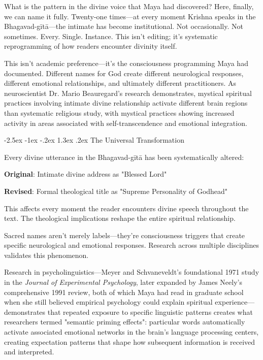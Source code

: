 \documentclass[12pt,twoside]{book}
\makeatletter
\renewcommand\section{\@startsection{section}{1}{\z@}%
{-2.5ex \@plus -1ex \@minus -.2ex}%
{1.3ex \@plus.2ex}%
{\normalfont\Large\bfseries}}
\makeatother
\begin{document}
\normalfont\justifying
What is the pattern in the divine voice that Maya had discovered? Here, finally, we can name it fully. Twenty-one times—at every moment Krishna speaks in the Bhagavad-gītā—the intimate has become institutional. Not occasionally. Not sometimes. Every. Single. Instance. This isn't editing; it's systematic reprogramming of how readers encounter divinity itself.

This isn't academic preference—it's the consciousness programming Maya had documented. Different names for God create different neurological responses, different emotional relationships, and ultimately different practitioners. As neuroscientist Dr. Mario Beauregard's research demonstrates, mystical spiritual practices involving intimate divine relationship activate different brain regions than systematic religious study, with mystical practices showing increased activity in areas associated with self-transcendence and emotional integration.

\vspace{-0.5cm}
\section{The Universal Transformation}
\label{sec:orgc6cb313}

Every divine utterance in the Bhagavad-gītā has been systematically altered:

\textbf{\textbf{Original}}: Intimate divine address as "Blessed Lord"

\textbf{\textbf{Revised}}: Formal theological title as "Supreme Personality of Godhead"

This affects every moment the reader encounters divine speech throughout the text. The theological implications reshape the entire spiritual relationship.


Sacred names aren't merely labels—they're consciousness triggers that create specific neurological and emotional responses. Research across multiple disciplines validates this phenomenon.

Research in psycholinguistics—Meyer and Schvaneveldt's foundational 1971 study in the \emph{Journal of Experimental Psychology}, later expanded by James Neely's comprehensive 1991 review, both of which Maya had read in graduate school when she still believed empirical psychology could explain spiritual experience—demonstrates that repeated exposure to specific linguistic patterns creates what researchers termed "semantic priming effects": particular words automatically activate associated emotional networks in the brain's language processing centers, creating expectation patterns that shape how subsequent information is received and interpreted.
\end{document}
